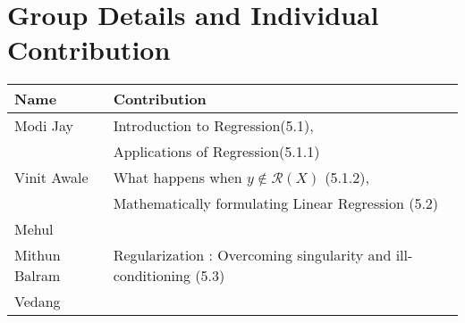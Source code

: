 \documentclass[11pt]{article}
\begin{document}
\section{Group Details and Individual Contribution}
\centering
\begin{tabular}{ |l|l|  }
 \hline
\textbf{Name} & \textbf{Contribution}
 \\
 \hline
 Modi Jay & Introduction to Regression(5.1), \\ &Applications of Regression(5.1.1)\\
 \hline
 Vinit Awale & What happens when $y \not \in \mathcal{R}(X)$ (5.1.2), \\    &Mathematically formulating Linear Regression (5.2) \\
 \hline
 Mehul & \\
 \hline
 Mithun Balram & Regularization : Overcoming singularity and ill-conditioning (5.3) \\
 \hline
 Vedang & \\
 \hline
\end{tabular}
\end{document}

